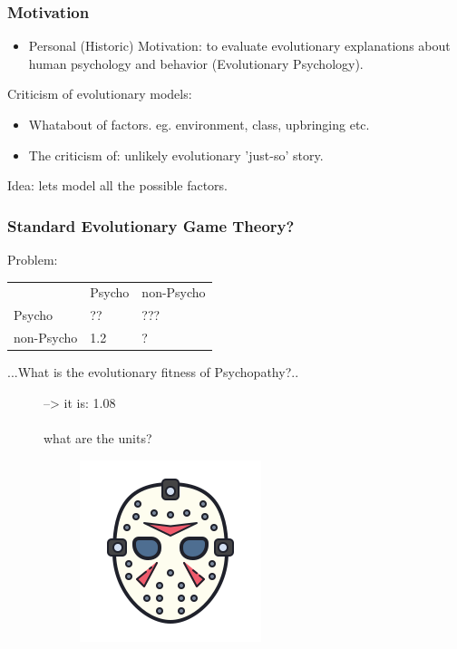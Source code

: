 \documentclass{beamer}
\begin{document}
\begin{frame}
\frametitle{Motivation}
\begin{itemize}
\item Personal (Historic) Motivation: to evaluate evolutionary explanations about human psychology and behavior (Evolutionary Psychology).\\
\end{itemize}
Criticism of evolutionary models:
\begin{itemize}
    \item Whatabout of factors. eg. environment, class, upbringing etc.
    \item The criticism of: unlikely evolutionary 'just-so' story.
\end{itemize}
Idea: lets model all the possible factors.
\end{frame}




\begin{frame}
\frametitle{Standard Evolutionary Game Theory?}
Problem:
\begin{table}[]
\begin{tabular}{lll}
                                & Psycho                   & non-Psycho               \\ \cline{2-3} 
\multicolumn{1}{l|}{Psycho}     & \multicolumn{1}{l|}{??}  & \multicolumn{1}{l|}{???} \\ \cline{2-3} 
\multicolumn{1}{l|}{non-Psycho} & \multicolumn{1}{l|}{1.2} & \multicolumn{1}{l|}{?}   \\ \cline{2-3} 
\end{tabular}
\end{table}
...What is the evolutionary fitness of Psychopathy?..
\-\\
\begin{figure}
\begin{minipage}{5cm}
--> it is: 1.08\\ \-\\
what are the units?
\end{minipage}
\begin{minipage}{5cm}
\begin{figure}
    \centering
    \includegraphics{jason-voorhees.png}
\end{figure}
\end{minipage}
\end{figure}
\end{frame}
\end{document}
